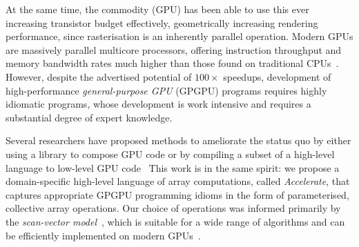 At the same time, the commodity  (GPU) has been
able to use this ever increasing transistor budget effectively, geometrically
increasing rendering performance, since rasterisation is an inherently parallel
operation.
%
Modern GPUs are massively parallel multicore processors, offering instruction
throughput and memory bandwidth rates much higher than those found on
traditional CPUs~\cite{NVIDIA:2012wf}. However, despite the advertised potential
of $100\times$ speedups, development of high-performance \emph{general-purpose
GPU} (GPGPU)
programs requires highly idiomatic programs, whose development is work intensive
and requires a substantial degree of expert knowledge.

Several researchers have proposed methods to ameliorate the status quo by either
using a library to compose GPU code or by compiling a subset of a high-level
language to low-level GPU
code~\cite{McCool:2004,Bond:2010bd,ThrustAParallelT:ub,Catanzaro:2011cn,Mainland:2010vj,CLyther:EvXSiruK}
This work is in the same spirit: we propose a domain-specific high-level
language of array computations, called \emph{Accelerate}, that captures
appropriate GPGPU programming idioms in the form of parameterised, collective
array operations. Our choice of operations was informed primarily by the
\emph{scan-vector model}~\cite{Chatterjee:1990vj}, which is suitable for a wide
range of algorithms and can be efficiently implemented on modern
GPUs~\cite{Sengupta:2007tc}.

